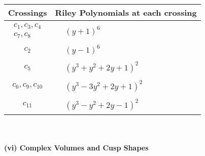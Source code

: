 \documentclass[1p]{elsarticle_modified}
\theoremstyle{definition}
\begin{document}
\begin{tabular}{m{50pt}|m{274pt}}
Crossings & \hspace{64pt}Riley Polynomials at each crossing \\
\hline $$\begin{aligned}c_{1},c_{3},c_{4}\\c_{7},c_{8}\end{aligned}$$&$\begin{aligned}
&(y+1)^6
\end{aligned}$\\
\hline $$\begin{aligned}c_{2}\end{aligned}$$&$\begin{aligned}
&(y-1)^6
\end{aligned}$\\
\hline $$\begin{aligned}c_{5}\end{aligned}$$&$\begin{aligned}
&(y^3+y^2+2 y+1)^2
\end{aligned}$\\
\hline $$\begin{aligned}c_{6},c_{9},c_{10}\end{aligned}$$&$\begin{aligned}
&(y^3-3 y^2+2 y+1)^2
\end{aligned}$\\
\hline $$\begin{aligned}c_{11}\end{aligned}$$&$\begin{aligned}
&(y^3- y^2+2 y-1)^2
\end{aligned}$\\
\hline
\end{tabular}\\~\\
\newpage\flushleft \textbf{(vi) Complex Volumes and Cusp Shapes}
\end{document}

